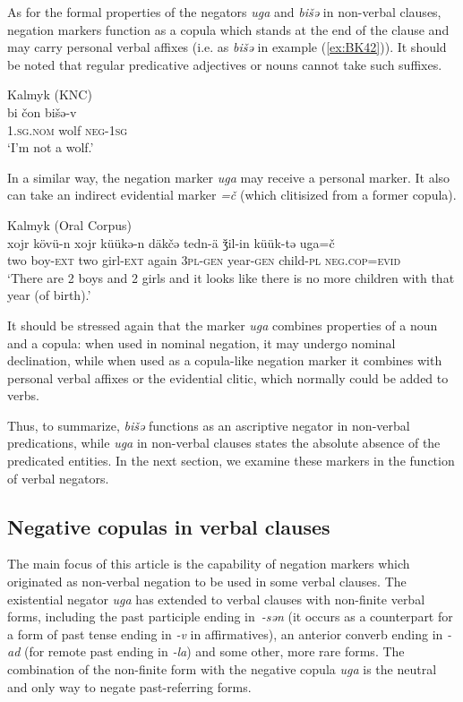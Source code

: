 \documentclass[output=paper,draft,draftmode,colorlinks,citecolor=brown]{langscibook}
\begin{document}
As for the formal properties of the negators \textit{uga} and \textit{bišǝ} in non-verbal clauses, negation markers function as a copula which stands at the end of the clause and may carry personal verbal affixes (i.e. as \textit{bišǝ} in example (\ref{ex:BK42})). It should be noted that regular predicative adjectives or nouns cannot take such suffixes.

\ea Kalmyk (KNC) \label{ex:BK42}\\
	\gll bi				čon	bišə-v\\
	\textsc{1.sg.nom}	wolf	\textsc{neg-1sg}\\
	\glt `I’m not a wolf.'
\z


In a similar way, the negation marker \textit{uga} may receive a personal marker. It also can take an indirect evidential marker \textit{=č} (which clitisized from a former copula).

\newpage
\ea Kalmyk (Oral Corpus) \label{ex:BK43}\\
	\gll xojr	kövü-n		xojr	küükǝ-n	däkčǝ		tedn-ä	ǯil-in			küük-tǝ	uga=č\\
	two	boy-\textsc{ext}		two	girl-\textsc{ext}	again		\textsc{3pl-gen}	year-\textsc{gen}		child-\textsc{pl}	\textsc{neg.cop=evid}\\
	\glt `There are 2 boys and 2 girls and it looks like there is no more children with that year (of birth).'
\z


It should be stressed again that the marker \textit{uga} combines properties of a noun and a copula: when used in nominal negation, it may undergo nominal declination, while when used as a copula-like negation marker it combines with personal verbal affixes or the evidential clitic, which normally could be added to verbs.

Thus, to summarize, \textit{bišǝ} functions as an ascriptive negator in non-verbal predications, while \textit{uga} in non-verbal clauses states the absolute absence of the predicated entities. In the next section, we examine these markers in the function of verbal negators.

\subsection{Negative copulas in verbal clauses}\label{sec:BK3.3}

The main focus of this article is the capability of negation markers which originated as non-verbal negation to be used in some verbal clauses. The existential negator \textit{uga} has extended to verbal clauses with non-finite verbal forms, including the past participle ending in \textit{-sǝn} (it occurs as a counterpart for a form of past tense ending in \textit{-v} in affirmatives), an anterior converb ending in \textit{-ad} (for remote past ending in \textit{-la}) and some other, more rare forms. The combination of the non-finite form with the negative copula \textit{uga} is the neutral and only way to negate past-referring forms.
\end{document}
